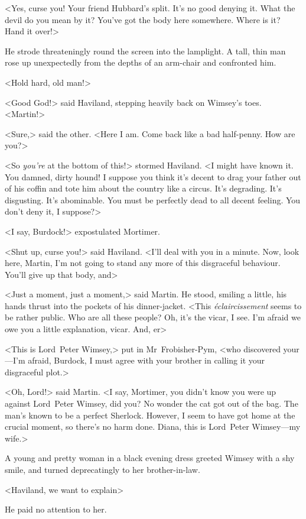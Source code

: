 <Yes, curse you! Your friend Hubbard's split. It's no good denying it. What the devil do you mean by it? You've got the body here somewhere. Where is it? Hand it over!>

He strode threateningly round the screen into the lamplight. A tall, thin man rose up unexpectedly from the depths of an arm-chair and confronted him.

<Hold hard, old man!>

<Good God!> said Haviland, stepping heavily back on Wimsey's toes. <Martin!>

<Sure,> said the other. <Here I am. Come back like a bad half-penny. How are you?>

<So \textit{you're} at the bottom of this!> stormed Haviland. <I might have known it. You damned, dirty hound! I suppose you think it's decent to drag your father out of his coffin and tote him about the country like a circus. It's degrading. It's disgusting. It's abominable. You must be perfectly dead to all decent feeling. You don't deny it, I suppose?>

<I say, Burdock!> expostulated Mortimer.

<Shut up, curse you!> said Haviland. <I'll deal with you in a minute. Now, look here, Martin, I'm not going to stand any more of this disgraceful behaviour. You'll give up that body, and\longdash>

<Just a moment, just a moment,> said Martin. He stood, smiling a little, his hands thrust into the pockets of his dinner-jacket. <This \textit{éclaircissement} seems to be rather public. Who are all these people? Oh, it's the vicar, I see. I'm afraid we owe you a little explanation, vicar. And, er\longdash>

<This is Lord~Peter Wimsey,> put in Mr~Frobisher-Pym, <who discovered your—I'm afraid, Burdock, I must agree with your brother in calling it your disgraceful plot.>

<Oh, Lord!> said Martin. <I say, Mortimer, you didn't know you were up against Lord~Peter Wimsey, did you? No wonder the cat got out of the bag. The man's known to be a perfect Sherlock. However, I seem to have got home at the crucial moment, so there's no harm done. Diana, this is Lord~Peter Wimsey—my wife.>

A young and pretty woman in a black evening dress greeted Wimsey with a shy smile, and turned deprecatingly to her brother-in-law.

<Haviland, we want to explain\longdash>

He paid no attention to her.


